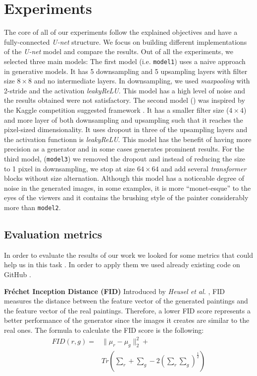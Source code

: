 \documentclass[10pt,twocolumn,letterpaper]{article}
\begin{document}
\section{Experiments}
The core of all of our experiments follow the explained objectives and have a fully-connected \textit{U-net} structure. We focus on building different implementations of the \textit{U-net} model and compare the results. Out of all the experiments, we selected three main models: The first model (i.e. \texttt{model1}) uses a naive approach in generative models. It has 5 downsampling and 5 upsampling layers with filter size $8 \times 8$ and no intermediate layers. In downsampling, we used \textit{maxpooling} with 2-stride and the activation \textit{leakyReLU}. This model has a high level of noise and the results obtained were not satisfactory. The second model () was inspired by the Kaggle competition suggested framework \cite{kaggle}. It has a smaller filter size ($4 \times 4$) and more layer of both downsampling and upsampling such that it reaches the pixel-sized dimensionality. It uses dropout in three of the upsampling layers and the activation functionn is \textit{leakyReLU}. This model has the benefit of having more precision as a generator and in some cases generates prominent results. For the third model, (\texttt{model3}) we removed the dropout and instead of reducing the size to 1 pixel in downsampling, we stop at size $64 \times 64$ and add several \textit{transformer} blocks without size alternation. Although this model has a noticeable degree of noise in the generated images, in some examples, it is more “monet-esque” to the eyes of the viewers and it contains the brushing style of the painter considerably more than \texttt{model2}. 

\subsection{Evaluation metrics}
In order to evaluate the results of our work we looked for some metrics that could help us in this task \cite{metrics}. In order to apply them we used already existing code on GitHub \cite{metricsRepo}.

\textbf{Fréchet Inception Distance (FID)} Introduced by \textit{Heusel et al.} \cite{fid}, FID measures the distance between the feature vector of the generated paintings and the feature vector of the real paintings. Therefore, a lower FID score represents a better performance of the generator since the images it creates are similar to the real ones. The formula to calculate the FID score is the following:
\begin{equation}
	\begin{split}
		\textstyle FID(r, g) = & \| \mu_{r} - \mu_{g} \| _{2}^{2} + \\ 
			& \textstyle Tr(\sum_{r} +  \sum_{g} - 2(\sum_{r}\sum_{g})^\frac{1}{2})
	\end{split}
\end{equation}
 
\end{document}
